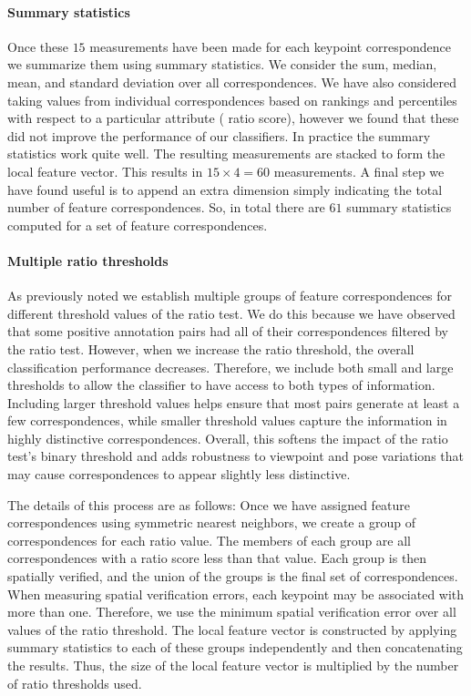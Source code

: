 \paragraph{Summary statistics}
Once these $15$ measurements have been made for each keypoint correspondence we summarize them using summary
  statistics.
We consider the sum, median, mean, and standard deviation over all correspondences.
We have also considered taking values from individual correspondences based on rankings and percentiles with
  respect to a particular attribute (\eg{} ratio score), however we found that these did not improve the
  performance of our classifiers.
In practice the summary statistics work quite well.
The resulting measurements are stacked to form the local feature vector.
This results in $15 \times 4 = 60$ measurements.
A final step we have found useful is to append an extra dimension simply indicating the total number of feature
  correspondences.
So, in total there are $61$ summary statistics computed for a set of feature correspondences.

\paragraph{Multiple ratio thresholds}
As previously noted we establish multiple groups of feature correspondences for different threshold values of the
  ratio test.
We do this because we have observed that some positive annotation pairs had all of their correspondences filtered
  by the ratio test.
However, when we increase the ratio threshold, the overall classification performance decreases.
Therefore, we include both small and large thresholds to allow the classifier to have access to both types of
  information.
Including larger threshold values helps ensure that most pairs generate at least a few correspondences, while
  smaller threshold values capture the information in highly distinctive correspondences.
Overall, this softens the impact of the ratio test's binary threshold and adds robustness to viewpoint and pose
  variations that may cause correspondences to appear slightly less distinctive.

The details of this process are as follows:
Once we have assigned feature correspondences using symmetric nearest neighbors, we create a group of
  correspondences for each ratio value.
The members of each group are all correspondences with a ratio score less than that value.
Each group is then spatially verified, and the union of the groups is the final set of correspondences.
When measuring spatial verification errors, each keypoint may be associated with more than one.
Therefore, we use the minimum spatial verification error over all values of the ratio threshold.
The local feature vector is constructed by applying summary statistics to each of these groups independently and
  then concatenating the results.
Thus, the size of the local feature vector is multiplied by the number of ratio thresholds used.

